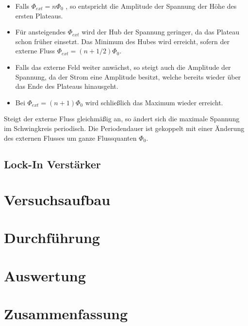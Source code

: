 \documentclass[12pt]{article}
\begin{document}
\begin{itemize}
 \item Falls $\Phi_{ext} = n \Phi_0$ , so entspricht die Amplitude der Spannung der Höhe des ersten Plateaus.
 \item Für ansteigendes $\Phi_{ext}$ wird der Hub der Spannung geringer, da das Plateau schon früher einsetzt.
       Das Minimum des Hubes wird erreicht, sofern der externe Fluss $\Phi_{ext} = (n + 1/2) \Phi_0$.
 \item Falls das externe Feld weiter anwächst, so steigt auch die Amplitude der Spannung, da der Strom eine Amplitude besitzt, welche bereits
       wieder über das Ende des Plateaus hinausgeht.
 \item Bei $\Phi_{ext} = (n + 1) \Phi_0$ wird schließlich das Maximum wieder erreicht.
\end{itemize}

Steigt der externe Fluss gleichmäßig an, so ändert sich die maximale Spannung im Schwingkreis periodisch. Die Periodendauer ist gekoppelt mit einer Änderung des externen Flusses um ganze Flussquanten $\Phi_0$.



\subsection{Lock-In Verstärker}



\section{Versuchsaufbau}

\section{Durchführung}

\section{Auswertung}

\section{Zusammenfassung}
\end{document}
